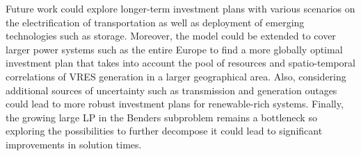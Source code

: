 \documentclass[final]{IEEEtran}
\begin{document}
Future work could explore longer-term investment plans with various scenarios on the electrification of transportation as well as deployment of emerging technologies such as storage. Moreover, the model could be extended to cover larger power systems such as the entire Europe to find a more globally optimal investment plan that takes into account the pool of resources and spatio-temporal correlations of VRES generation in a larger geographical area. Also, considering additional sources of uncertainty such as transmission and generation outages could lead to more robust investment plans for renewable-rich systems. Finally, the growing large LP in the Benders subproblem remains a bottleneck so exploring the possibilities to further decompose it could lead to significant improvements in solution times.



\end{document}
